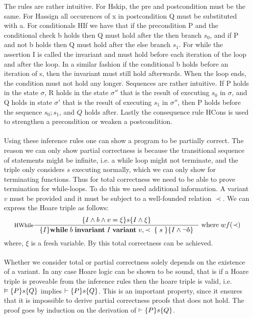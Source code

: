 The rules are rather intuitive.
For Hskip, the pre and postcondition must be the same.
For Hassign all occurences of x in postcondition Q must be substituted with a.
For conditionals HIf we have that if the precondition P and the conditional check b holds then Q must hold after the then branch $s_{0}$, and if P and not b holds then Q must hold after the else branch $s_1$.
For while the assertion I is called the invariant and must hold before each iteration of the loop and after the loop.
In a similar fashion if the conditional b holds before an iteration of s, then the invariant must still hold afterwards.
When the loop ends, the condition must not hold any longer.
Sequences are rather intuitive. If P holds in the state $\sigma$, R holds in the state $\sigma''$ that
is the result of executing $s_{0}$ in $\sigma$, and Q holds in state $\sigma'$ that is the result of
executing $s_{1}$ in $\sigma''$, then P holds before the sequence $s_{0}; s_{1}$, and $Q$ holds after.
Lastly the consequence rule HCons is used to strengthen a precondition or weaken a postcondition.
\\~\\
Using these inference rules one can show a program to be partially correct.
The reason we can only show partial correctness is because the transitional sequence of statements might be infinite, i.e. a while loop might not terminate, and the triple only considers $s$ executing normally, which we can only show for terminating functions.
Thus for total correctness we need to be able to prove termination for while-loops.
To do this we need additional information.
A variant $v$ must be provided and it must
be subject to a well-founded relation $\prec$.
We can express the Hoare triple as follows:
\[
\inference[HWhile]{\hoare{I \wedge b \wedge v = \xi }{s}{I \wedge \xi}}
{\hoare{I}{ \mathbf{while} \; b \; \mathbf{invariant} \; I \; \mathbf{variant} \; v, \prec \; \{ \; s \; \} }{I \wedge \neg b}} \; \text{where} \; wf(\prec)
\]
where, $\xi$ is a fresh variable.
By this total correctness can be achieved.
\\~\\
Whether we consider total or partial correctness solely depends on the existence of a variant.
In any case Hoare logic can be shown to be sound, that is if a Hoare triple is proveable from the inference rules then the hoare triple is valid, i.e. $\vDash \{P\}s\{Q\}$ implies $\vdash \{P\}s\{Q\}$.
This is an important property, since it ensures that it is impossible to derive partial correctness proofs that does not hold.
The proof goes by induction on the derivation of $\vdash \{P\}s\{Q\}$.
